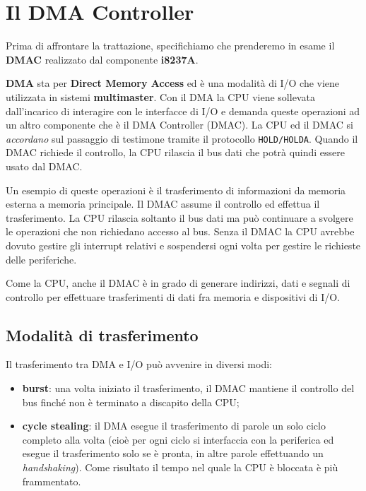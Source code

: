 \documentclass[11pt]{book}
\begin{document}
\chapter{Il DMA Controller}

Prima di affrontare la trattazione, specifichiamo che prenderemo in
esame il \textbf{DMAC} realizzato dal componente \textbf{i8237A}.

\textbf{DMA} sta per \textbf{Direct Memory Access} ed \`e una
modalit\`a di I/O che viene utilizzata in sistemi
\textbf{multimaster}. Con il DMA la CPU viene sollevata dall'incarico
di interagire con le interfacce di I/O e demanda queste operazioni ad
un altro componente che \`e il DMA Controller (DMAC). La CPU ed il
DMAC si \textit{accordano} sul passaggio di testimone tramite il
protocollo {\tt HOLD/HOLDA}. Quando il DMAC richiede il controllo, la
CPU rilascia il bus dati che potr\`a quindi essere usato dal DMAC.

Un esempio di queste operazioni \`e il trasferimento di informazioni
da memoria esterna a memoria principale. Il DMAC assume il controllo
ed effettua il trasferimento. La CPU rilascia soltanto il bus dati ma
pu\`o continuare a svolgere le operazioni che non richiedano accesso
al bus. Senza il DMAC la CPU avrebbe dovuto gestire gli interrupt
relativi e sospendersi ogni volta per gestire le richieste delle
periferiche.

Come la CPU, anche il DMAC \`e in grado di generare indirizzi, dati e
segnali di controllo per effettuare trasferimenti di dati fra memoria
e dispositivi di I/O.

\section{Modalit\`a di trasferimento}

Il trasferimento tra DMA e I/O pu\`o avvenire in diversi modi: 
\begin{itemize}
\item \textbf{burst}: una volta iniziato il trasferimento, il DMAC
  mantiene il controllo del bus finch\'e non \`e terminato a discapito
  della CPU; 

\item \textbf{cycle stealing}: il DMA esegue il trasferimento di
  parole un solo ciclo completo alla volta (cio\`e per ogni ciclo si
  interfaccia con la periferica ed esegue il trasferimento solo se \`e
  pronta, in altre parole effettuando un \textit{handshaking}). Come
  risultato il tempo nel quale la CPU \`e bloccata \`e pi\`u
  frammentato.

\end{itemize}
\end{document}
